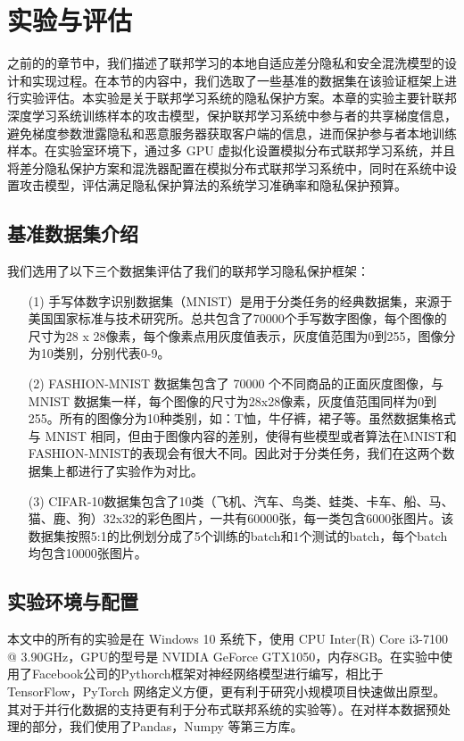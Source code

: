 \chapter{实验与评估}
\label{ch5}
之前的的章节中，我们描述了联邦学习的本地自适应差分隐私和安全混洗模型的设计和实现过程。在本节的内容中，我们选取了一些基准的数据集在该验证框架上进行实验评估。本实验是关于联邦学习系统的隐私保护方案。本章的实验主要针联邦深度学习系统训练样本的攻击模型，保护联邦学习系统中参与者的共享梯度信息，避免梯度参数泄露隐私和恶意服务器获取客户端的信息，进而保护参与者本地训练样本。在实验室环境下，通过多 GPU 虚拟化设置模拟分布式联邦学习系统，并且将差分隐私保护方案和混洗器配置在模拟分布式联邦学习系统中，同时在系统中设置攻击模型，评估满足隐私保护算法的系统学习准确率和隐私保护预算。 
\section{基准数据集介绍}
我们选用了以下三个数据集评估了我们的联邦学习隐私保护框架：
\begin{enumerate}
	\item [(1)] 手写体数字识别数据集（MNIST）是用于分类任务的经典数据集，来源于美国国家标准与技术研究所。总共包含了70000个手写数字图像，每个图像的尺寸为28 x 28像素，每个像素点用灰度值表示，灰度值范围为0到255，图像分为10类别，分别代表0-9。
	\item [(2)] FASHION-MNIST 数据集包含了 70000 个不同商品的正面灰度图像，与 MNIST 数据集一样，每个图像的尺寸为28x28像素，灰度值范围同样为0到255。所有的图像分为10种类别，如：T恤，牛仔裤，裙子等。虽然数据集格式与 MNIST 相同，但由于图像内容的差别，使得有些模型或者算法在MNIST和FASHION-MNIST的表现会有很大不同。因此对于分类任务，我们在这两个数据集上都进行了实验作为对比。
	\item [(3)] CIFAR-10数据集包含了10类（飞机、汽车、鸟类、蛙类、卡车、船、马、猫、鹿、狗）32x32的彩色图片，一共有60000张，每一类包含6000张图片。该数据集按照5:1的比例划分成了5个训练的batch和1个测试的batch，每个batch均包含10000张图片。

\end{enumerate}

\section{实验环境与配置}
本文中的所有的实验是在 Windows 10 系统下，使用 CPU Inter(R) Core i3-7100 @ 3.90GHz，GPU的型号是 NVIDIA GeForce GTX1050，内存8GB。在实验中使用了Facebook公司的Pythorch框架对神经网络模型进行编写，相比于TensorFlow，PyTorch 网络定义方便，更有利于研究小规模项目快速做出原型。其对于并行化数据的支持更有利于分布式联邦系统的实验等）。在对样本数据预处理的部分，我们使用了Pandas，Numpy 等第三方库。

